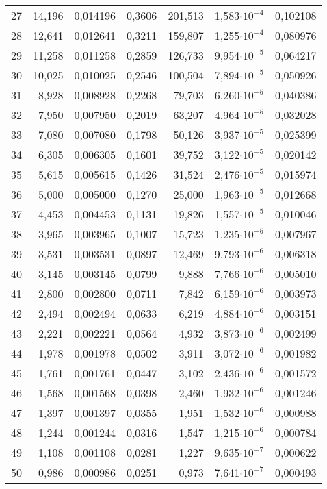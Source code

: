 \begin{longtable}{crrrrrr}
27 &     14,196 &   0,014196 &     0,3606 &    201,513 &  1,583$\cdot 10^{-4}$ &   0,102108 \\
28 &     12,641 &   0,012641 &     0,3211 &    159,807 &  1,255$\cdot 10^{-4}$ &   0,080976 \\
29 &     11,258 &   0,011258 &     0,2859 &    126,733 &  9,954$\cdot 10^{-5}$ &   0,064217 \\
30 &     10,025 &   0,010025 &     0,2546 &    100,504 &  7,894$\cdot 10^{-5}$ &   0,050926 \\
31 &      8,928 &   0,008928 &     0,2268 &     79,703 &  6,260$\cdot 10^{-5}$ &   0,040386 \\
32 &      7,950 &   0,007950 &     0,2019 &     63,207 &  4,964$\cdot 10^{-5}$ &   0,032028 \\
33 &      7,080 &   0,007080 &     0,1798 &     50,126 &  3,937$\cdot 10^{-5}$ &   0,025399 \\
34 &      6,305 &   0,006305 &     0,1601 &     39,752 &  3,122$\cdot 10^{-5}$ &   0,020142 \\
35 &      5,615 &   0,005615 &     0,1426 &     31,524 &  2,476$\cdot 10^{-5}$ &   0,015974 \\
36 &      5,000 &   0,005000 &     0,1270 &     25,000 &  1,963$\cdot 10^{-5}$ &   0,012668 \\
37 &      4,453 &   0,004453 &     0,1131 &     19,826 &  1,557$\cdot 10^{-5}$ &   0,010046 \\
38 &      3,965 &   0,003965 &     0,1007 &     15,723 &  1,235$\cdot 10^{-5}$ &   0,007967 \\
39 &      3,531 &   0,003531 &     0,0897 &     12,469 &  9,793$\cdot 10^{-6}$ &   0,006318 \\
40 &      3,145 &   0,003145 &     0,0799 &      9,888 &  7,766$\cdot 10^{-6}$ &   0,005010 \\
41 &      2,800 &   0,002800 &     0,0711 &      7,842 &  6,159$\cdot 10^{-6}$ &   0,003973 \\
42 &      2,494 &   0,002494 &     0,0633 &      6,219 &  4,884$\cdot 10^{-6}$ &   0,003151 \\
43 &      2,221 &   0,002221 &     0,0564 &      4,932 &  3,873$\cdot 10^{-6}$ &   0,002499 \\
44 &      1,978 &   0,001978 &     0,0502 &      3,911 &  3,072$\cdot 10^{-6}$ &   0,001982 \\
45 &      1,761 &   0,001761 &     0,0447 &      3,102 &  2,436$\cdot 10^{-6}$ &   0,001572 \\
46 &      1,568 &   0,001568 &     0,0398 &      2,460 &  1,932$\cdot 10^{-6}$ &   0,001246 \\
47 &      1,397 &   0,001397 &     0,0355 &      1,951 &  1,532$\cdot 10^{-6}$ &   0,000988 \\
48 &      1,244 &   0,001244 &     0,0316 &      1,547 &  1,215$\cdot 10^{-6}$ &   0,000784 \\
49 &      1,108 &   0,001108 &     0,0281 &      1,227 &  9,635$\cdot 10^{-7}$ &   0,000622 \\
50 &      0,986 &   0,000986 &     0,0251 &      0,973 &  7,641$\cdot 10^{-7}$ &   0,000493 \\
\bottomrule[1pt]
\end{longtable}

